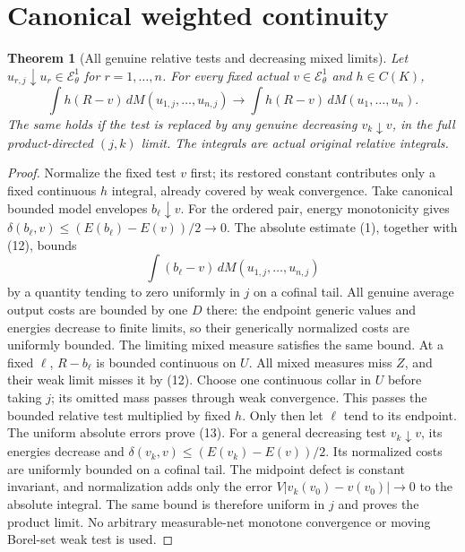 \documentclass[11pt]{article}
\newtheorem{theorem}{Theorem}
\newcommand{\EE}{\mathcal E^1_\theta}
\begin{document}
\section{Canonical weighted continuity}
\begin{theorem}[All genuine relative tests and decreasing mixed limits]
Let $u_{r,j}\downarrow u_r\in\EE$ for $r=1,\ldots,n$.
For every fixed actual $v\in\EE$ and $h\in C(K)$,
\[
 \int h(R-v)\,dM(u_{1,j},\ldots,u_{n,j})
 \longrightarrow
 \int h(R-v)\,dM(u_1,\ldots,u_n).                       \tag{13}
\]
The same holds if the test is replaced by any genuine
decreasing $v_k\downarrow v$, in the full product-directed
$(j,k)$ limit. The integrals are actual original relative integrals.
\end{theorem}
\begin{proof}
Normalize the fixed test $v$ first; its restored constant contributes
only a fixed continuous $h$ integral, already covered by weak convergence.
Take canonical bounded model envelopes $b_\ell\downarrow v$.
For the ordered pair, energy monotonicity gives
$\delta(b_\ell,v)\leq(E(b_\ell)-E(v))/2\to0$.
The absolute estimate (1), together with (12), bounds
\[
 \int(b_\ell-v)\,dM(u_{1,j},\ldots,u_{n,j})
\]
by a quantity tending to zero uniformly in $j$ on a cofinal tail.
All genuine average output costs are bounded by one $D$ there:
the endpoint generic values and energies decrease to finite limits,
so their generically normalized costs are uniformly bounded.
The limiting mixed measure satisfies the same bound.
At a fixed $\ell$, $R-b_\ell$ is bounded continuous on $U$.
All mixed measures miss $Z$, and their weak limit misses it by
(12). Choose one continuous collar in $U$ before taking $j$;
its omitted mass passes through weak convergence.
This passes the bounded relative test multiplied by fixed $h$.
Only then let $\ell$ tend to its endpoint.
The uniform absolute errors prove (13).
For a general decreasing test $v_k\downarrow v$, its energies
decrease and
$\delta(v_k,v)\leq(E(v_k)-E(v))/2$.
Its normalized costs are uniformly bounded on a cofinal tail.
The midpoint defect is constant invariant, and normalization adds
only the error $V|v_k(v_0)-v(v_0)|\to0$ to the absolute integral.
The same bound is therefore uniform in $j$ and proves the product limit.
No arbitrary measurable-net monotone convergence or moving
Borel-set weak test is used.
\end{proof}
\end{document}
